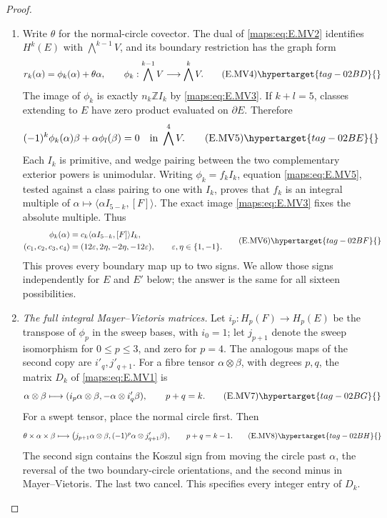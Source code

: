 \begin{proof}
\begin{enumerate}[label={$\langle1\rangle$\arabic*.},leftmargin=*]
\item Write $\theta$ for the normal-circle covector. The dual of
\eqref{maps:eq:E.MV2} identifies $H^k(E)$ with $\bigwedge^{k-1}V$, and
its boundary restriction has the graph form
\[
 r_k(\alpha)=\phi_k(\alpha)+\theta\alpha,
 \qquad
 \phi_k:\bigwedge^{k-1}V\longrightarrow\bigwedge^kV.
 \tag{E.MV4}\hypertarget{tag-02BD}{}\label{maps:eq:E.MV4}
\]
The image of $\phi_k$ is exactly $n_k\mathbb Z I_k$ by
\eqref{maps:eq:E.MV3}. If $k+l=5$, classes extending to $E$ have zero
product evaluated on $\partial E$. Therefore
\[
 (-1)^k\phi_k(\alpha)\beta+
                    \alpha\phi_l(\beta)=0
 \quad\text{in }\bigwedge^4V.
 \tag{E.MV5}\hypertarget{tag-02BE}{}\label{maps:eq:E.MV5}
\]
Each $I_k$ is primitive, and wedge pairing between the two
complementary exterior powers is unimodular. Writing
$\phi_k=f_k I_k$, equation \eqref{maps:eq:E.MV5}, tested against a class
pairing to one with $I_k$, proves that $f_k$ is an integral
multiple of $\alpha\mapsto\langle\alpha I_{5-k},[F]\rangle$.
The exact image \eqref{maps:eq:E.MV3} fixes the absolute multiple. Thus
\[
 \begin{split}
 \phi_k(\alpha)&=c_k
       \langle\alpha I_{5-k},[F]\rangle I_k,\\
 (c_1,c_2,c_3,c_4)&=(12\varepsilon,2\eta,-2\eta,-12\varepsilon),
 \qquad \varepsilon,\eta\in\{1,-1\}.
 \end{split}
 \tag{E.MV6}\hypertarget{tag-02BF}{}\label{maps:eq:E.MV6}
\]
This proves every boundary map up to two signs. We allow those
signs independently for $E$ and $E'$ below; the answer is the
same for all sixteen possibilities.

\item \emph{The full integral Mayer--Vietoris matrices.}
Let $i_p:H_p(F)\to H_p(E)$ be the transpose of $\phi_p$ in
the sweep bases, with $i_0=1$; let $j_{p+1}$ denote the sweep
isomorphism for $0\leq p\leq3$, and zero for $p=4$.
The analogous maps of the second copy are $i'_q,j'_{q+1}$.
For a fibre tensor $\alpha\otimes\beta$, with degrees $p,q$,
the matrix $D_k$ of \eqref{maps:eq:E.MV1} is
\[
 \alpha\otimes\beta\longmapsto
  (i_p\alpha\otimes\beta,-\alpha\otimes i'_q\beta),
 \qquad p+q=k.
 \tag{E.MV7}\hypertarget{tag-02BG}{}\label{maps:eq:E.MV7}
\]
For a swept tensor, place the normal circle first. Then
\[
 \theta\times\alpha\times\beta\longmapsto
 \bigl(j_{p+1}\alpha\otimes\beta,
                 (-1)^p\alpha\otimes j'_{q+1}\beta\bigr),
 \qquad p+q=k-1.
 \tag{E.MV8}\hypertarget{tag-02BH}{}\label{maps:eq:E.MV8}
\]
The second sign contains the Koszul sign from moving the circle
past $\alpha$, the reversal of the two boundary-circle
orientations, and the second minus in Mayer--Vietoris. The last
two cancel. This specifies every integer entry of $D_k$.


\end{enumerate}
\end{proof}
